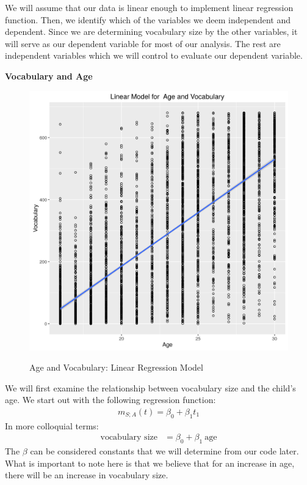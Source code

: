 \documentclass[11pt]{article}  %
\begin{document}
\indent We will assume that our data is linear enough to implement linear regression function. Then, we identify which of the variables we deem independent and dependent. Since we are determining vocabulary size by the other variables, it will serve as our dependent variable for most of our analysis. The rest are independent variables which we will control to evaluate our dependent variable.

\textbf{Vocabulary and Age}

\begin{figure}[h]
\centering
\caption{Age and Vocabulary: Linear Regression Model}
\includegraphics[scale=.50]{AgeVocab}
\label{fig:AVF}
\end{figure}

\indent We will first examine the relationship between vocabulary size and the child's age. We start out with the following regression function:
    \begin{align*}
        m_{S;A}(t) = \beta_0 + \beta_1 t_1
    \end{align*}
    In more colloquial terms:
    \begin{align*}
        \text{vocabulary size} &= \beta_0 + \beta_1\ \text{age}
    \end{align*}
\indent The $\beta$ can be considered constants that we will determine from our code later. What is important to note here is that we believe that for an increase in age, there will be an increase in vocabulary size.
\end{document}
